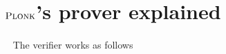 \documentclass[runningheads,11pt]{llncs}
\theoremstyle{definition}
\begin{document}
\appendix
\section{$\textsc{Plonk}$'s prover explained}
\label{sec:plonk_explained}

\paragraph{}


\paragraph{}\ \newline
The \plonk{} verifier works as follows
\end{document}
